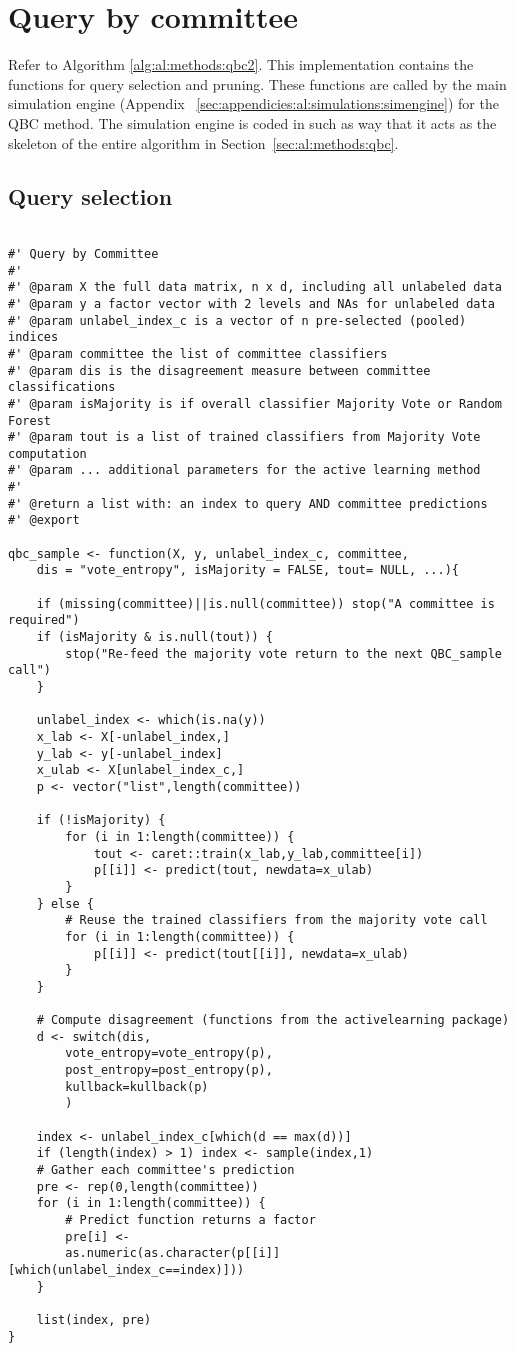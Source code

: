 \section{Query by committee}
\label{sec:appendicies:al:qbc}

Refer to Algorithm \ref{alg:al:methods:qbc2}. 
This implementation contains the functions for query selection and pruning. 
These functions are called by the main simulation engine (Appendix 
~\ref{sec:appendicies:al:simulations:simengine}) for the QBC method. 
The simulation engine is coded in such as way that it acts as the skeleton 
of the entire algorithm in Section~\ref{sec:al:methods:qbc}.
\subsection{Query selection}
{
\begin{lstlisting}

#' Query by Committee
#'
#' @param X the full data matrix, n x d, including all unlabeled data
#' @param y a factor vector with 2 levels and NAs for unlabeled data
#' @param unlabel_index_c is a vector of n pre-selected (pooled) indices
#' @param committee the list of committee classifiers
#' @param dis is the disagreement measure between committee classifications
#' @param isMajority is if overall classifier Majority Vote or Random Forest
#' @param tout is a list of trained classifiers from Majority Vote computation 
#' @param ... additional parameters for the active learning method
#'
#' @return a list with: an index to query AND committee predictions
#' @export

qbc_sample <- function(X, y, unlabel_index_c, committee,
	dis = "vote_entropy", isMajority = FALSE, tout= NULL, ...){
	
	if (missing(committee)||is.null(committee)) stop("A committee is required")
	if (isMajority & is.null(tout)) {
		stop("Re-feed the majority vote return to the next QBC_sample call")
	}
	
	unlabel_index <- which(is.na(y))
	x_lab <- X[-unlabel_index,]
	y_lab <- y[-unlabel_index]
	x_ulab <- X[unlabel_index_c,]
	p <- vector("list",length(committee))
	
	if (!isMajority) {
		for (i in 1:length(committee)) {
			tout <- caret::train(x_lab,y_lab,committee[i])
			p[[i]] <- predict(tout, newdata=x_ulab)
		}
	} else {
		# Reuse the trained classifiers from the majority vote call
		for (i in 1:length(committee)) {
			p[[i]] <- predict(tout[[i]], newdata=x_ulab)
		}
	}

	# Compute disagreement (functions from the activelearning package)
	d <- switch(dis,
		vote_entropy=vote_entropy(p),
		post_entropy=post_entropy(p),
		kullback=kullback(p)
		)
	
	index <- unlabel_index_c[which(d == max(d))]
	if (length(index) > 1) index <- sample(index,1)
	# Gather each committee's prediction
	pre <- rep(0,length(committee))
	for (i in 1:length(committee)) {
		# Predict function returns a factor
		pre[i] <- 
		as.numeric(as.character(p[[i]][which(unlabel_index_c==index)]))
	}
	
	list(index, pre)
}
\end{lstlisting}
}



